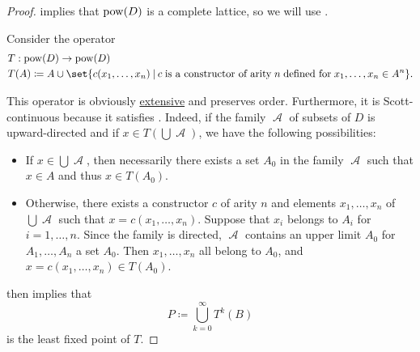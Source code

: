 \begin{proof}
   implies that \( \operatorname{pow}(D) \) is a complete lattice, so we will use .

  Consider the operator
  \begin{equation*}
    \begin{aligned}
      &T: \pow(D) \to \pow(D) \\
      &T(A) \coloneqq A \cup \set{ c(x_1, \ldots, x_n) \given c \T{is a constructor of arity} n \T{defined for} x_1, \ldots, x_n \in A^n }.
    \end{aligned}
  \end{equation*}

  This operator is obviously \hyperref[def:extensive_function]{extensive} and preserves order. Furthermore, it is Scott-continuous because it satisfies . Indeed, if the family \( \mscrA \) of subsets of \( D \) is upward-directed and if \( x \in T(\bigcup \mscrA) \), we have the following possibilities:
  \begin{itemize}
    \item If \( x \in \bigcup \mscrA \), then necessarily there exists a set \( A_0 \) in the family \( \mscrA \) such that \( x \in A \) and thus \( x \in T(A_0) \).
    \item Otherwise, there exists a constructor \( c \) of arity \( n \) and elements \( x_1, \ldots, x_n \) of \( \bigcup \mscrA \) such that \( x = c(x_1, \ldots, x_n) \). Suppose that \( x_i \) belongs to \( A_i \) for \( i = 1, \ldots, n \). Since the family is directed, \( \mscrA \) contains an upper limit \( A_0 \) for \( A_1, \ldots, A_n \) a set \( A_0 \). Then \( x_1, \ldots, x_n \) all belong to \( A_0 \), and \( x = c(x_1, \ldots, x_n) \in T(A_0) \).
  \end{itemize}

   then implies that
  \begin{equation*}
    P \coloneqq \bigcup_{k=0}^\infty T^k(B)
  \end{equation*}
  is the least fixed point of \( T \).
\end{proof}

